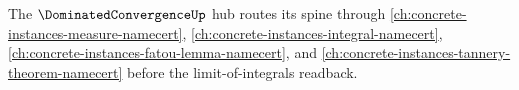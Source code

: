 The $\DominatedConvergenceUp$ hub routes its spine through \autoref{ch:concrete-instances-measure-namecert}, \autoref{ch:concrete-instances-integral-namecert}, \autoref{ch:concrete-instances-fatou-lemma-namecert}, and \autoref{ch:concrete-instances-tannery-theorem-namecert} before the limit-of-integrals readback.






